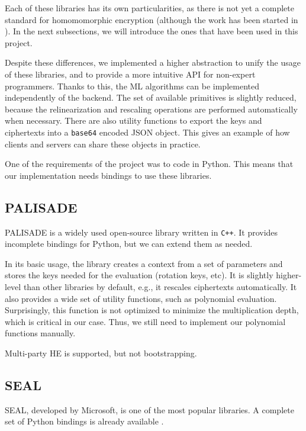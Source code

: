 \documentclass[a4paper,11pt,oneside]{report}
\begin{document}
Each of these libraries has its own particularities, as there is not yet a complete standard for homomomorphic encryption (although the work has been started in \cite{albrecht_homomorphic_2021}). 
In the next subsections, we will introduce the ones that have been used in this project.

Despite these differences, we implemented a higher abstraction to unify the usage of these libraries, and to provide a more intuitive API for non-expert programmers. 
Thanks to this, the ML algorithms can be implemented independently of the backend. 
The set of available primitives is slightly reduced, because the relinearization and rescaling operations are performed automatically when necessary.
There are also utility functions to export the keys and ciphertexts into a \texttt{base64} encoded JSON object.
This gives an example of how clients and servers can share these objects in practice.

One of the requirements of the project was to code in Python. 
This means that our implementation needs bindings to use these libraries.

\subsection{PALISADE}

PALISADE is a widely used open-source library written in \texttt{C++}. 
It provides incomplete bindings for Python, but we can extend them as needed. 

In its basic usage, the library creates a context from a set of parameters and stores the keys needed for the evaluation (rotation keys, etc). 
It is slightly higher-level than other libraries by default, e.g., it rescales ciphertexts automatically. 
It also provides a wide set of utility functions, such as polynomial evaluation. 
Surprisingly, this function is not optimized to minimize the multiplication depth, which is critical in our case.
Thus, we still need to implement our polynomial functions manually.

Multi-party HE is supported, but not bootstrapping.

\subsection{SEAL}

SEAL, developed by Microsoft, is one of the most popular libraries. 
A complete set of Python bindings is already available \cite{hugang_seal-python_2022}.
\end{document}
